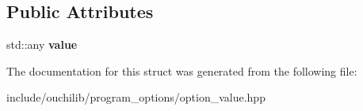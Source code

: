 \subsection*{Public Attributes}
\begin{DoxyCompactItemize}
\item 
\mbox{\label{structouchi_1_1program__options_1_1detail_1_1option__info_3_01_char_t_00_01multi__value_3_01_t_01_4_00_01_traits_01_4_a802e2f0ccf28fd8201fc5d208720bb46}} 
std\+::any {\bfseries value}
\end{DoxyCompactItemize}


The documentation for this struct was generated from the following file\+:\begin{DoxyCompactItemize}
\item 
include/ouchilib/program\+\_\+options/option\+\_\+value.\+hpp\end{DoxyCompactItemize}
